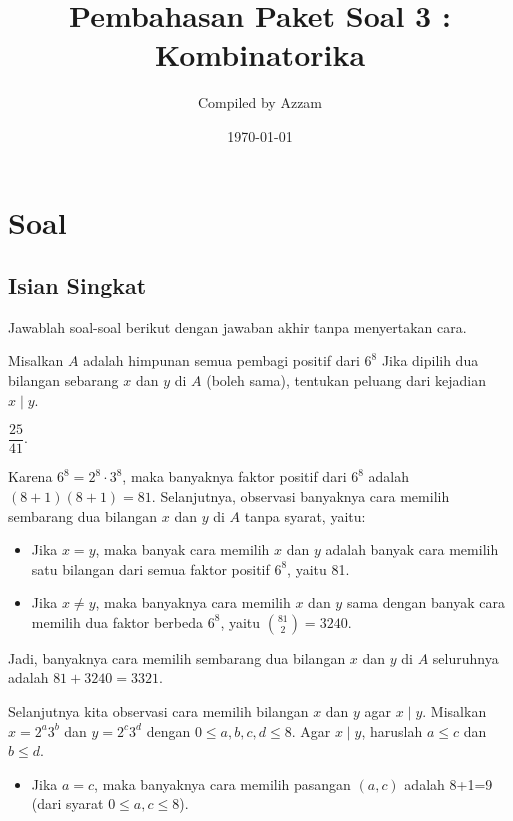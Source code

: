 \documentclass[11pt]{scrartcl}
\begin{document}
	\title{Pembahasan Paket Soal 3 : Kombinatorika} %
	\date{\today}
	\author{Compiled by Azzam}
	\maketitle
	\newpage
	
	\section{Soal}
\subsection{Isian Singkat}
Jawablah soal-soal berikut dengan jawaban akhir tanpa menyertakan cara.

	\begin{soalbaru}
		Misalkan $A$ adalah himpunan semua pembagi positif dari $6^8$ Jika dipilih dua bilangan sebarang $x$ dan $y$ di $A$ (boleh sama), tentukan peluang dari kejadian $x \mid y$. 
		
		\begin{jawaban}
			$\dfrac{25}{41}$.
		\end{jawaban}
		\begin{solusi}
		Karena $6^8 = 2^8 \cdot 3^8$, maka banyaknya faktor positif dari $6^8$ adalah $(8+1)(8+1)=81$. Selanjutnya, observasi banyaknya cara memilih sembarang dua bilangan $x$ dan $y$ di $A$ tanpa syarat, yaitu:
		\begin{itemize}
		\item Jika $x=y$, maka banyak cara memilih $x$ dan $y$ adalah banyak cara memilih satu bilangan dari semua faktor positif $6^8$, yaitu 81.
		
		\item Jika $x\neq y$, maka banyaknya cara memilih $x$ dan $y$ sama dengan banyak cara memilih dua faktor berbeda $6^8$, yaitu $81 \choose 2$$= 3240$.
		\end{itemize}
		
		Jadi, banyaknya cara memilih sembarang dua bilangan $x$ dan $y$ di $A$ seluruhnya adalah $81+3240=3321$.
		
		Selanjutnya kita observasi cara memilih bilangan $x$ dan $y$ agar $x \mid y$. Misalkan $x=2^a3^b$ dan $y=2^c3^d$ dengan $0 \le a,b,c,d \le 8$. Agar $x \mid y$, haruslah $a \le c$ dan $b \le d$.
		\begin{itemize}
		\item Jika $a=c$, maka banyaknya cara memilih pasangan $(a,c)$ adalah 8+1=9 (dari syarat $0 \le a,c \le 8$).
		

\end{itemize}
\end{solusi}
\end{soalbaru}
\end{document}
